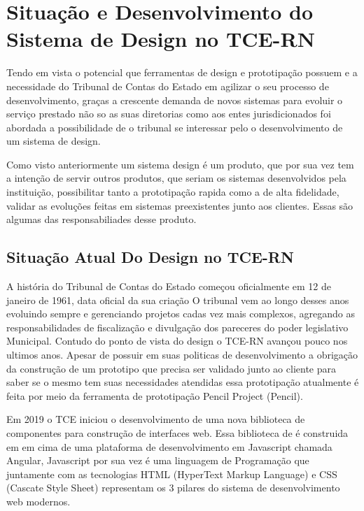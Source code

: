 \chapter[Capítulo 3]{Situação e Desenvolvimento do Sistema de Design no TCE-RN}
\label{ch:cap3}

  Tendo em vista o potencial que ferramentas de design e prototipação possuem e a necessidade do Tribunal de Contas do Estado em agilizar o seu processo de desenvolvimento, graças a crescente demanda de novos sistemas para evoluir o serviço prestado não so as suas diretorias como aos entes jurisdicionados foi abordada a possibilidade de o tribunal se interessar pelo o desenvolvimento de um sistema de design.

  Como visto anteriormente um sistema design é um produto, que por sua vez tem a intenção de servir outros produtos, que seriam os sistemas desenvolvidos pela instituição, possibilitar tanto a prototipação rapida como a de alta fidelidade, validar as evoluções feitas em sistemas preexistentes junto aos clientes. Essas são algumas das responsabiliades desse produto.

\section{Situação Atual Do Design no TCE-RN} \label{secao31}
  A história do Tribunal de Contas do Estado começou oficialmente em 12 de janeiro de 1961, data oficial da sua criação \cite{historia_tribunal} O tribunal vem ao longo desses anos evoluindo sempre e gerenciando projetos cadas vez mais complexos, agregando as responsabilidades de fiscalização e divulgação dos pareceres do poder legislativo Municipal. Contudo do ponto de vista do design o TCE-RN avançou pouco nos ultimos anos. Apesar de possuir em suas politicas de desenvolvimento a obrigação da construção de um prototipo que precisa ser validado junto ao cliente para saber se o mesmo tem suas necessidades atendidas essa prototipação atualmente é feita por meio da ferramenta de prototipação Pencil Project (Pencil).

  Em 2019 o TCE iniciou o desenvolvimento de uma nova biblioteca de componentes para construção de interfaces web. Essa biblioteca de é construida em em cima de uma plataforma de desenvolvimento em Javascript chamada Angular, Javascript por sua vez é uma linguagem de Programação que juntamente com as tecnologias HTML (HyperText Markup Language) e CSS (Cascate Style Sheet) representam os 3 pilares do sistema de desenvolvimento web modernos.

